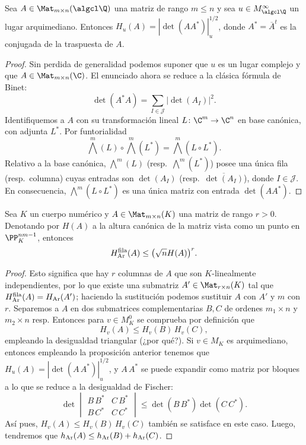 \documentclass[teoria-numeros.tex]{subfiles}
\begin{document}
\begin{prop}\label{thm:arakelov_binet_formula}
	Sea $A \in \Mat_{m\times n}(\algcl\Q)$ una matriz de rango $m \le n$ y sea $u \in M_{\algcl\Q}^\infty$ un lugar arquimediano.
	Entonces $H_u(A) = |\det(A A^*)|_u^{1/2}$, donde $A^* = \overline{A}^t$ es la conjugada de la traspuesta de $A$.
\end{prop}
\begin{proof}
	Sin perdida de generalidad podemos suponer que $u$ es un lugar complejo y que $A \in \Mat_{m\times n}(\C)$.
	El enunciado ahora se reduce a la clásica fórmula de Binet:
	$$ \det(A^* A) = \sum_{I \in \mathcal{J}} |\det(A_I)|^2. $$
	Identifiquemos a $A$ con su transformación lineal $L \colon \C^m \to \C^n$ en base canónica, con adjunta $L^*$.
	Por funtorialidad
	$$ \bigwedge^m(L) \circ \bigwedge^m(L^*) = \bigwedge^m(L\circ L^*). $$
	Relativo a la base canónica, $\bigwedge^m(L)$ (resp.\ $\bigwedge^m(L^*)$) posee una única fila (resp.\ columna) cuyas entradas
	son $\det(A_I)$ (resp.\ $\overline{\det(A_I)}$), donde $I \in \mathcal{J}$.
	En consecuencia, $\bigwedge^m(L\circ L^*)$ es una única matriz con entrada $\det(A A^*)$.
\end{proof}
\begin{cor}\label{thm:arklv_can_hgt_mat}
	Sea $K$ un cuerpo numérico y $A \in \Mat_{m\times n}(K)$ una matriz de rango $r > 0$.
	Denotando por $H(A)$ a la altura canónica de la matriz vista como un punto en $\PP^{nm - 1}_K$, entonces
	\[
		H_{\mathrm{Ar}}^{\rm fila}(A) \le \big( \sqrt{n} H(A) \big)^r.
	\]
\end{cor}
\begin{proof}
	Esto significa que hay $r$ columnas de $A$ que son $K$-linealmente independientes, por lo que existe una submatriz $A' \in \Mat_{r\times n}(K)$
	tal que $H_{\mathrm{Ar}}^{\rm fila}(A) = H_{\mathrm{Ar}}(A')$; haciendo la sustitución podemos sustituir $A$ con $A'$ y $m$ con $r$.
	Separemos a $A$ en dos submatrices complementarias $B, C$ de ordenes $m_1\times n$ y $m_2\times n$ resp.
	Entonces para $v \in M_K^0$ se comprueba por definición que
	$$ H_v(A) \le H_v(B) \, H_v(C), $$
	empleando la desigualdad triangular (¿por qué?).
	Si $v \in M_K$ es arquimediano, entonces empleando la proposición anterior tenemos que $H_u(A) = |\det(A\,A^*)|_u^{1/2}$,
	y $A\,A^*$ se puede expandir como matriz por bloques a lo que se reduce a la desigualdad de Fischer:
	\[
		\det
		\begin{vmatrix}
			B\,B^* & C\,B^* \\
			B\,C^* & C\,C^*
		\end{vmatrix} 
		\le \det(B\,B^*) \det(C\,C^*).
	\]
	Así pues, $H_v(A) \le H_v(B) \, H_v(C)$ también se satisface en este caso.
	Luego, tendremos que $h_{\mathrm{Ar}}(A) \le h_{\mathrm{Ar}}(B) + h_{\mathrm{Ar}}(C)$.
\end{proof}
\end{document}
